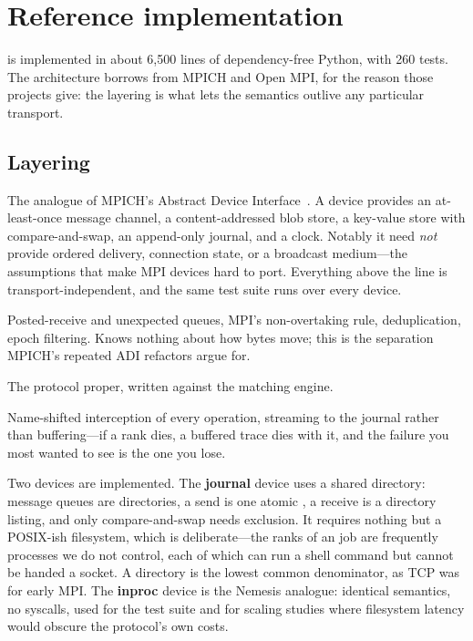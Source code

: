 \section{Reference implementation}
\label{sec:impl}

\ampi{} is implemented in about 6{,}500 lines of dependency-free Python,
with 260 tests. The architecture borrows from MPICH and Open MPI, for the
reason those projects give: the layering is what lets the semantics outlive
any particular transport.

\subsection{Layering}

\begin{description}[leftmargin=1.2em,style=nextline]
\item[Device interface] The analogue of MPICH's Abstract Device
Interface~\cite{balaji2020mpich}. A device provides an at-least-once
message channel, a content-addressed blob store, a key-value store with
compare-and-swap, an append-only journal, and a clock. Notably it need
\emph{not} provide ordered delivery, connection state, or a broadcast
medium---the assumptions that make MPI devices hard to port. Everything
above the line is transport-independent, and the same test suite runs over
every device.

\item[Matching engine] Posted-receive and unexpected queues, MPI's
non-overtaking rule, deduplication, epoch filtering. Knows nothing about how
bytes move; this is the separation MPICH's repeated ADI refactors argue for.

\item[Communicators, collectives, RMA, I/O, fault tolerance] The protocol
proper, written against the matching engine.

\item[Profiler] Name-shifted interception of every operation, streaming to
the journal rather than buffering---if a rank dies, a buffered trace dies
with it, and the failure you most wanted to see is the one you lose.
\end{description}

Two devices are implemented. The \textbf{journal} device uses a shared
directory: message queues are directories, a send is one atomic
, a receive is a directory listing, and only compare-and-swap
needs exclusion. It requires nothing but a POSIX-ish filesystem, which is
deliberate---the ranks of an \ampi{} job are frequently processes we do not
control, each of which can run a shell command but cannot be handed a
socket. A directory is the lowest common denominator, as TCP was for early
MPI. The \textbf{inproc} device is the Nemesis analogue: identical
semantics, no syscalls, used for the test suite and for scaling studies
where filesystem latency would obscure the protocol's own costs.

